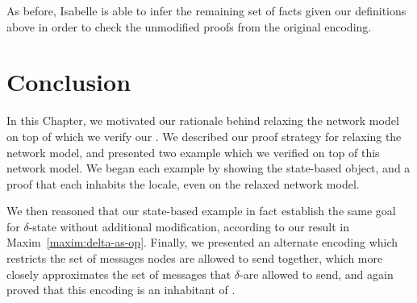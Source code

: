 As before, Isabelle is able to infer the remaining set of facts given our
definitions above in order to check the unmodified proofs from the original
encoding.

\section{Conclusion}

In this Chapter, we motivated our rationale behind relaxing the network model
on top of which we verify our \CRDTs. We described our proof strategy for
relaxing the network model, and presented two example \CRDTs which we verified
on top of this network model. We began each example by showing the state-based
object, and a proof that each \CRDT inhabits the \SEC locale, even on the
relaxed network model.

We then reasoned that our state-based example \CRDTs in fact establish the same
goal for $\delta$-state \CRDTs without additional modification, according to our
result in Maxim~\ref{maxim:delta-as-op}. Finally, we presented an alternate
encoding which restricts the set of messages nodes are allowed to send together,
which more closely approximates the set of messages that $\delta$-\CRDTs are
allowed to send, and again proved that this encoding is an inhabitant of \SEC.
